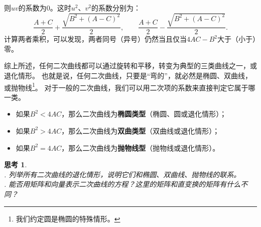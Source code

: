 \documentclass[12pt,UTF8]{ctexbook}
\theoremstyle{definition}
\theoremstyle{plain}
\newtheorem{sk}{思考}[section]
\begin{document}


则$uv$的系数为$0$。这时$u^2$、$v^2$的系数分别为：
$$ \frac{A+C}{2} + \frac{\sqrt{B^2 + (A - C)^2}}{2}, \qquad \frac{A+C}{2} - \frac{\sqrt{B^2 + (A - C)^2}}{2}. $$
计算两者乘积，可以发现，两者同号（异号）仍然当且仅当$4AC - B^2$大于（小于）零。

综上所述，任何二次曲线都可以通过旋转和平移，转变为典型的三类曲线之一，或退化情形。
也就是说，任何二次曲线，只要是“弯的”，就必然是椭圆、双曲线，或抛物线\footnote{我们约定圆是椭圆的特殊情形。}。
对于一般的二次曲线，我们可以用二次项的系数来直接判定它属于哪一类。
\begin{itemize}
    \item 如果$B^2<4AC$，那么二次曲线为\textbf{椭圆类型}（椭圆、圆或退化情形）；
    \item 如果$B^2>4AC$，那么二次曲线为\textbf{双曲类型}（双曲线或退化情形）；
    \item 如果$B^2=4AC$，那么二次曲线为\textbf{抛物线型}（抛物线或退化情形）。
\end{itemize}

\begin{sk}
    \mbox{} \\
    . 列举所有二次曲线的退化情形，说明它们和椭圆、双曲线、抛物线的联系。\\
    . 能否用矩阵和向量表示二次曲线的方程？这里的矩阵和直变换的矩阵有什么不同？
\end{sk}
\end{document}
